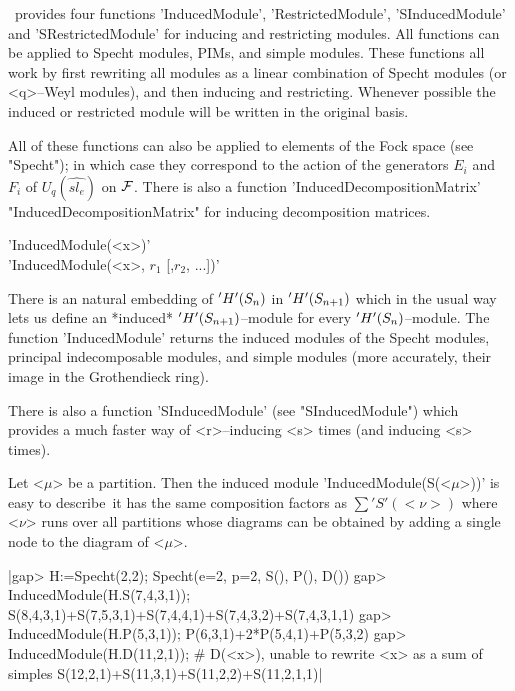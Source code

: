 
\Specht\ provides four functions 'InducedModule', 'RestrictedModule', 
'SInducedModule' and 'SRestrictedModule' for inducing and restricting 
modules. All functions can be applied to Specht modules, PIMs, and simple 
modules. These functions all work by first rewriting all modules as a 
linear combination of Specht modules (or <q>--Weyl modules), and then 
inducing and restricting. Whenever possible the induced or restricted 
module will be written in the original basis.

All of these functions can also be applied to elements of the Fock
space (see "Specht"); in which case they correspond to the action of
the generators $E_i$ and $F_i$ of $U_q(\widehat{sl_e})$ on ${\cal F}$. There 
is also a function 'InducedDecompositionMatrix' 
"InducedDecompositionMatrix" for inducing decomposition matrices.



'InducedModule(<x>)'\\
'InducedModule(<x>, $r_1$ [,$r_2$, ...])'

There is an natural embedding of $'H'(S_n)$ in $'H'(S_{n+1})$
which in the usual way lets us define an *induced* 
$'H'(S_{n+1})$--module for every $'H'(S_n)$--module. The
function 'InducedModule' returns the induced modules of the Specht 
modules, principal indecomposable modules, and simple modules (more
accurately, their image in the Grothendieck ring).

There is also a function 'SInducedModule' (see "SInducedModule") which 
provides a much faster way of <r>--inducing <s> times (and inducing <s> 
times).

Let <$\mu$> be a partition. Then the induced module 
'InducedModule(S(<$\mu$>))' is easy to describe\:\ it has the same 
composition factors as 
                 $  \sum 'S'(<\nu>)  $ 
where <$\nu$> runs over all partitions whose diagrams can be obtained by 
adding a single node to the diagram of <$\mu$>. 

|gap> H:=Specht(2,2);
Specht(e=2, p=2, S(), P(), D())
gap> InducedModule(H.S(7,4,3,1));
S(8,4,3,1)+S(7,5,3,1)+S(7,4,4,1)+S(7,4,3,2)+S(7,4,3,1,1)
gap> InducedModule(H.P(5,3,1));
P(6,3,1)+2*P(5,4,1)+P(5,3,2)
gap> InducedModule(H.D(11,2,1));
# D(<x>), unable to rewrite <x> as a sum of simples
S(12,2,1)+S(11,3,1)+S(11,2,2)+S(11,2,1,1)|

